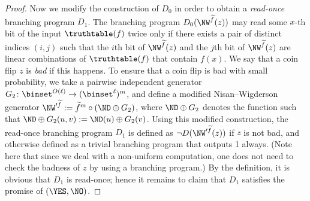 \documentclass{toc}
\begin{document}
\begin{proof}
  Now we modify the construction of $D_0$ in order to obtain a \emph{read-once} branching program $D_1$.
  The branching program $D_0(\NW^{\widetilde{f}}(z))$ may read some $x$-th bit of the input $\truthtable(f)$ twice only if
  there exists a pair of distinct indices $(i, j)$ such that the $i$th bit of $\NW^{\widetilde{f}}(z)$ and the $j$th bit of $\NW^{\widetilde{f}}(z)$
  are linear combinations of $\truthtable(f)$ that contain $f(x)$.
  We say that a coin flip $z$ is \emph{bad} if this happens.
  To ensure that a coin flip is bad with small probability,
  we take a pairwise independent generator $G_2 \colon \binset^{O(\ell)} \to (\binset^{\ell})^{m}$,
  and define a modified Nisan--Wigderson generator $\NW'^{\widetilde{f}} := {\widetilde{f}}^m \circ (\ND \oplus G_2)$,
  where $\ND \oplus G_2$ denotes the function such that $\ND \oplus G_2(u, v) := \ND(u) \oplus G_2(v)$.
  Using this modified construction,
  the read-once branching program $D_1$ is defined as $\neg D(\NW'^{\widetilde{f}}(z))$ if $z$ is not bad, and otherwise defined as a trivial branching program that outputs 1 always.
  (Note here that since we deal with a non-uniform computation, one does not need to check the badness of $z$ by using a branching program.)
  By the definition, it is obvious that $D_1$ is read-once; hence it remains to claim that $D_1$ satisfies the promise of $(\YES, \NO)$.


\end{proof}
\end{document}
